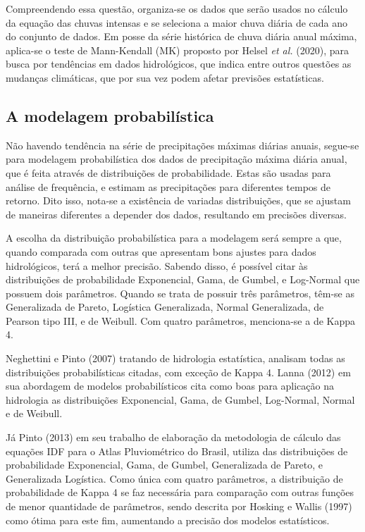 Compreendendo essa questão, organiza-se os dados que serão usados no cálculo da equação das chuvas intensas e se seleciona a maior chuva diária de cada ano do conjunto de dados. Em posse da série histórica de chuva diária anual máxima, aplica-se o teste de Mann-Kendall (MK) proposto por Helsel \textit{et al.} (2020), para busca por tendências em dados hidrológicos, que indica entre outros questões as mudanças climáticas, que por sua vez podem afetar previsões estatísticas.

\subsection{A modelagem probabilística}

Não havendo tendência na série de precipitações máximas diárias anuais, segue-se para modelagem probabilística dos dados de precipitação máxima diária anual, que é feita através de distribuições de probabilidade. Estas são usadas para análise de frequência, e estimam as precipitações para diferentes tempos de retorno. Dito isso, nota-se a existência de variadas distribuições, que se ajustam de maneiras diferentes a depender dos dados, resultando em precisões diversas. 

A escolha da distribuição probabilística para a modelagem será sempre a que, quando comparada com outras que apresentam bons ajustes para dados hidrológicos, terá a melhor precisão. Sabendo disso, é possível citar às distribuições de probabilidade Exponencial, Gama, de Gumbel, e Log-Normal que possuem dois parâmetros. Quando se trata de possuir três parâmetros, têm-se as Generalizada de Pareto, Logística Generalizada, Normal Generalizada, de Pearson tipo III, e de Weibull. Com quatro parâmetros, menciona-se a de Kappa 4.

Neghettini e Pinto (2007) tratando de hidrologia estatística, analisam todas as distribuições probabilísticas citadas, com exceção de Kappa 4. Lanna (2012) em sua abordagem de modelos probabilísticos cita como boas para aplicação na hidrologia as distribuições Exponencial, Gama, de Gumbel, Log-Normal, Normal e de Weibull. 

Já Pinto (2013) em seu trabalho de elaboração da metodologia de cálculo das equações IDF para o Atlas Pluviométrico do Brasil, utiliza das distribuições de probabilidade Exponencial, Gama, de Gumbel, Generalizada de Pareto, e Generalizada Logística. Como única com quatro parâmetros, a distribuição de probabilidade de Kappa 4 se faz necessária para comparação com outras funções de menor quantidade de parâmetros, sendo descrita por Hosking e Wallis (1997) como ótima para este fim, aumentando a precisão dos modelos estatísticos.

